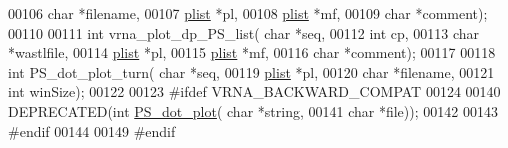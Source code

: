 \begin{DoxyCode}
00106                       \textcolor{keywordtype}{char} *filename,
00107                       \hyperlink{group__struct__utils_structvrna__elem__prob__s}{plist} *pl,
00108                       \hyperlink{group__struct__utils_structvrna__elem__prob__s}{plist} *mf,
00109                       \textcolor{keywordtype}{char} *comment);
00110 
00111 \textcolor{keywordtype}{int} vrna\_plot\_dp\_PS\_list( \textcolor{keywordtype}{char} *seq,
00112                           \textcolor{keywordtype}{int} cp,
00113                           \textcolor{keywordtype}{char} *wastlfile,
00114                           \hyperlink{group__struct__utils_structvrna__elem__prob__s}{plist} *pl,
00115                           \hyperlink{group__struct__utils_structvrna__elem__prob__s}{plist} *mf,
00116                           \textcolor{keywordtype}{char} *comment);
00117 
00118 \textcolor{keywordtype}{int} PS\_dot\_plot\_turn( \textcolor{keywordtype}{char} *seq,
00119                       \hyperlink{group__struct__utils_structvrna__elem__prob__s}{plist} *pl,
00120                       \textcolor{keywordtype}{char} *filename,
00121                       \textcolor{keywordtype}{int} winSize);
00122 
00123 \textcolor{preprocessor}{#ifdef VRNA\_BACKWARD\_COMPAT}
00124 
00140 DEPRECATED(\textcolor{keywordtype}{int} \hyperlink{group__plotting__utils_ga689a97a7e3b8a2df14728b8204d9d57b}{PS\_dot\_plot}( \textcolor{keywordtype}{char} *\textcolor{keywordtype}{string},
00141                             \textcolor{keywordtype}{char} *file));
00142 
00143 \textcolor{preprocessor}{#endif}
00144 
00149 \textcolor{preprocessor}{#endif}
\end{DoxyCode}
